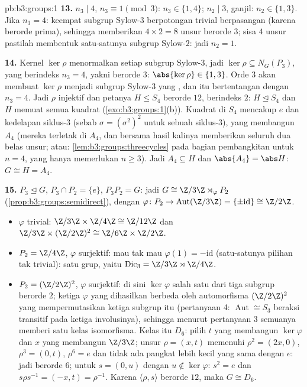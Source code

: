 \begin{solution}{pb:b3:groups:1}
\textbf{13.} $n_3 \mid 4$, $n_3 \equiv 1 \pmod 3$: $n_3 \in \{1,
4\}$; $n_2 \mid 3$, ganjil: $n_2 \in \{1, 3\}$. Jika $n_3 = 4$: keempat
subgrup Sylow-$3$ berpotongan trivial berpasangan (karena berorde
prima), sehingga memberikan $4 \times 2 = 8$ unsur berorde $3$; sisa
$4$ unsur pastilah membentuk satu-satunya subgrup
Sylow-$2$: jadi $n_2 = 1$.

\textbf{14.} Kernel $\ker\rho$ menormalkan setiap subgrup Sylow-$3$, jadi
$\ker \rho \subseteq N_G(P_3)$, yang berindeks $n_3 = 4$, yakni
berorde $3$: $\abs{\ker\rho} \in \{1, 3\}$. Orde $3$ akan membuat
$\ker\rho$ menjadi subgrup Sylow-$3$ yang \emph{}, dan itu bertentangan dengan $n_3
= 4$. Jadi $\rho$ injektif dan petanya $H \leq S_4$ berorde
$12$, berindeks $2$: $H \trianglelefteq S_4$ dan $H$ memuat semua
kuadrat (\cref{exo:b3:groups:1}(b)). Kuadrat di $S_4$ mencakup
$e$ dan kedelapan siklus-$3$ (sebab $\sigma = (\sigma^2)^2$ untuk sebuah
siklus-$3$), yang membangun $A_4$ (mereka terletak di $A_4$, dan bersama
hasil kalinya memberikan seluruh dua belas unsur; atau:
\cref{lem:b3:groups:threecycles} pada bagian pembangkitan untuk $n = 4$,
yang hanya memerlukan $n \geq 3$). Jadi $A_4 \subseteq H$ dan $\abs{A_4}
= \abs H$: $G \cong H = A_4$.

\textbf{15.} $P_3 \trianglelefteq G$, $P_3 \cap P_2 = \{e\}$,
$P_3P_2 = G$: jadi $G \cong \Z/3\Z \rtimes_\varphi P_2$
(\cref{prop:b3:groups:semidirect}), dengan $\varphi \colon P_2 \to
\operatorname{Aut}(\Z/3\Z) = \{\pm\mathrm{id}\} \cong \Z/2\Z$.
\begin{itemize}
  \item $\varphi$ trivial:  $\Z/3\Z \times \Z/4\Z
        \cong \Z/12\Z$ dan $\Z/3\Z \times (\Z/2\Z)^2 \cong \Z/6\Z
        \times \Z/2\Z$.
  \item $P_2 = \Z/4\Z$, $\varphi$ surjektif: mau tak mau
        $\varphi(1) = -\mathrm{id}$ (satu-satunya pilihan tak trivial):
        satu grup, yaitu $\mathrm{Dic}_3 = \Z/3\Z \rtimes \Z/4\Z$.
  \item $P_2 = (\Z/2\Z)^2$, $\varphi$ surjektif: di sini $\ker\varphi$
        salah satu dari tiga subgrup berorde $2$; ketiga
        $\varphi$ yang dihasilkan berbeda oleh automorfisma $(\Z/2\Z)^2$
        yang mempermutasikan ketiga subgrup itu (pertanyaan 4: $\operatorname{Aut}
        \cong S_3$ beraksi transitif pada ketiga involusinya), sehingga
        menurut pertanyaan 3 semuanya memberi satu kelas isomorfisma. Kelas itu
        $D_6$: pilih $t$ yang membangun $\ker\varphi$ dan $x$
        yang membangun $\Z/3\Z$; unsur $\rho = (x, t)$ memenuhi
        $\rho^2 = (2x, 0)$, $\rho^3 = (0, t)$, $\rho^6 = e$ dan tidak ada
        pangkat lebih kecil yang sama dengan $e$: jadi berorde $6$; untuk $s = (0, u)$ dengan $u
        \notin \ker\varphi$: $s^2 = e$ dan $s\rho s^{-1} = (-x, t)
        = \rho^{-1}$. Karena $\langle \rho, s\rangle$ berorde $12$,
        maka $G \cong D_6$.
\end{itemize}


\end{solution}
